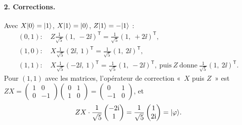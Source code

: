 \begin{correction}
\paragraph{2. Corrections.} Avec $X|0\rangle=|1\rangle$, $X|1\rangle=|0\rangle$, $Z|1\rangle=-|1\rangle$ :
\begin{align*}
  (0,1):\ & Z\tfrac{1}{\sqrt5}(1,\ -2\ii)^{\mathsf T}=\tfrac{1}{\sqrt5}(1,\ +2\ii)^{\mathsf T},\\
  (1,0):\ & X\tfrac{1}{\sqrt5}(2\ii,\ 1)^{\mathsf T}=\tfrac{1}{\sqrt5}(1,\ 2\ii)^{\mathsf T},\\
  (1,1):\ & X\tfrac{1}{\sqrt5}(-2\ii,\ 1)^{\mathsf T}=\tfrac{1}{\sqrt5}(1,\ -2\ii)^{\mathsf T},
            \ \text{puis}\ Z\ \text{donne}\ \tfrac{1}{\sqrt5}(1,\ 2\ii)^{\mathsf T}.
\end{align*}
Pour $(1,1)$ avec les matrices, l'opérateur de correction «~$X$ puis $Z$~» est
$ZX=\begin{pmatrix}1&0\\0&-1\end{pmatrix}\begin{pmatrix}0&1\\1&0\end{pmatrix}=\begin{pmatrix}0&1\\-1&0\end{pmatrix}$,
et
\[
  ZX\cdot\frac{1}{\sqrt5}\begin{pmatrix}-2\mathrm{i}\\1\end{pmatrix}
  =\frac{1}{\sqrt5}\begin{pmatrix}1\\2\mathrm{i}\end{pmatrix}=|\varphi\rangle.
\]


\end{correction}
